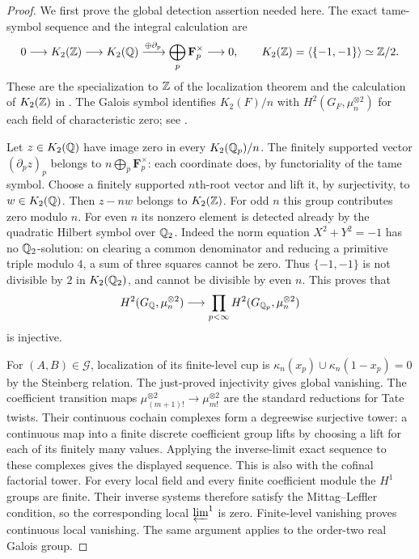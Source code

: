 \begin{proof}
We first prove the global detection assertion needed here. The exact
tame-symbol sequence and the integral calculation are
\[
0\longrightarrow K_2(\mathbb Z)\longrightarrow K_2(\mathbb Q)
 \xrightarrow{\oplus\partial_p}\bigoplus_p\mathbf F_p^\times
 \longrightarrow0,
\qquad K_2(\mathbb Z)=\langle\{-1,-1\}\rangle\simeq\mathbb Z/2.
\]
These are the specialization to $\mathbb Z$ of the localization theorem and
the calculation of $K_2(\mathbb Z)$ in
\cite[III.5.2.2, III.6.5--6.5.1]{Weibel2013}.
The Galois symbol identifies $K_2(F)/n$ with
$H^2(G_F,\mu_n^{\otimes2})$ for each field of characteristic zero;
see \cite[III.6.10.3--6.10.4, VI.4.1.1]{Weibel2013}.

Let $z\in K_2(\mathbb Q)$ have image zero in every $K_2(\mathbb Q_p)/n$.
The finitely supported vector $(\partial_p z)_p$ belongs to
$n\bigoplus_p\mathbf F_p^\times$: each coordinate does, by functoriality
of the tame symbol. Choose a finitely supported $n$th-root vector and
lift it, by surjectivity, to $w\in K_2(\mathbb Q)$. Then $z-nw$ belongs to
$K_2(\mathbb Z)$. For odd $n$ this group contributes zero modulo $n$.
For even $n$ its nonzero element is detected already by the quadratic
Hilbert symbol over $\mathbb Q_2$. Indeed the norm equation
$X^2+Y^2=-1$ has no $\mathbb Q_2$-solution: on clearing a common denominator
and reducing a primitive triple modulo $4$, a sum of three squares
cannot be zero. Thus $\{-1,-1\}$ is not divisible by $2$ in
$K_2(\mathbb Q_2)$, and cannot be divisible by even $n$. This proves that
\[
H^2(G_\mathbb Q,\mu_n^{\otimes2})
 \longrightarrow\prod_{p<\infty}H^2(G_{\mathbb Q_p},\mu_n^{\otimes2})
\]
is injective.

For $(A,B)\in\mathcal G$, localization of its finite-level cup is
$\kappa_n(x_p)\cup\kappa_n(1-x_p)=0$ by the Steinberg relation.
The just-proved injectivity gives global vanishing. The coefficient
transition maps $\mu_{(m+1)!}^{\otimes2}\to\mu_{m!}^{\otimes2}$
are the standard reductions for Tate twists. Their continuous cochain
complexes form a degreewise surjective tower: a continuous map into a
finite discrete coefficient group lifts by choosing a lift for each
of its finitely many values. Applying the inverse-limit exact sequence
to these complexes gives the displayed sequence. This is also
\cite[(2.1), Theorem (2.2)]{Jannsen1988} with the cofinal factorial
tower. For every local field and every finite coefficient module the
$H^1$ groups are finite. Their inverse systems therefore satisfy the
Mittag--Leffler condition, so the corresponding local $\varprojlim^1$
is zero. Finite-level vanishing proves continuous local vanishing.
The same argument applies to the order-two real Galois group.
\end{proof}

